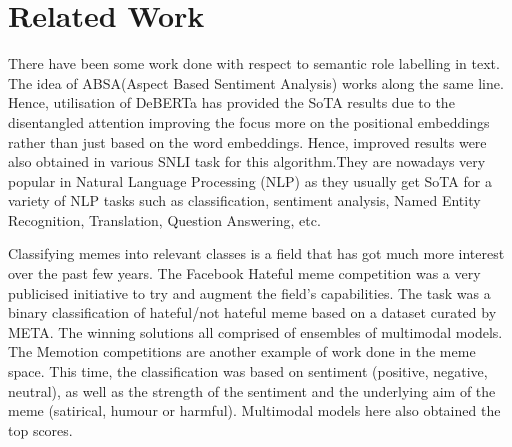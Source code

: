 \documentclass[11pt]{article}
\begin{document}
\section{Related Work}

There have been some work done with respect to semantic role labelling in text. The idea of ABSA(Aspect Based Sentiment Analysis) works along the same line. Hence, utilisation of DeBERTa has provided the SoTA results \cite{silvaaspect} due to the disentangled attention improving the focus more on the positional embeddings rather than just based on the word embeddings. Hence, improved results were also obtained in various SNLI task for this algorithm\cite{he2020deberta}.They are nowadays very popular in Natural Language Processing (NLP) as they usually get SoTA for a variety of NLP tasks such as classification, sentiment analysis, Named Entity Recognition, Translation, Question Answering, etc.
 

Classifying memes into relevant classes is a field that has got much more interest over the past few years. The Facebook Hateful meme competition\cite{kiela2020hateful} was a very publicised initiative to try and augment the field's capabilities. The task was a binary classification of hateful/not hateful meme based on a dataset curated by META. The winning solutions all comprised of ensembles of multimodal models. The Memotion competitions\cite{sharma2020semeval} are another example of work done in the meme space. This time, the classification was based on sentiment (positive, negative, neutral), as well as the strength of the sentiment and the underlying aim of the meme (satirical, humour or harmful). Multimodal models here also obtained the top scores.
\end{document}
